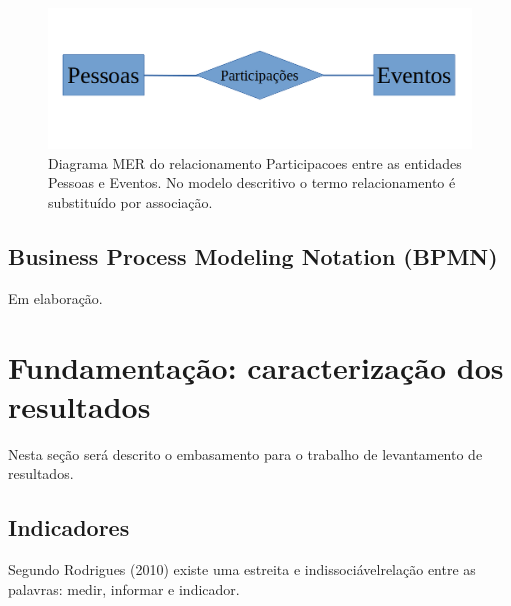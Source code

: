 \documentclass[
12pt,		%
openright,	%
twoside,  %
a4paper,			%
chapter=TITLE,		%
english,			%
french,				%
spanish,			%
brazil				%
]{USPSC-classe/USPSC_RedarTex}
\begin{document}
\captionsetup{format=plain}
\begin{figure}[Htb]

	\begin{center}

		\includegraphics[max size={\textwidth}]{../../imagens/MER-crop.png}

	\end{center}

	\caption{\label{4ad8e04d43602c7274b5a26b3a07d2b00c68d1d7}Diagrama MER do relacionamento Participacoes entre as entidades Pessoas e Eventos. No modelo descritivo o termo relacionamento \'e substitu\'{i}do por associa\c{c}\~ao.}

\end{figure}

\subsection[Business Process Modeling Notation (BPMN)]{Business Process Modeling Notation (BPMN)}\label{Business Process Modeling Notation (BPMN)}
Em elabora\c{c}\~ao.








\section[Fundamenta\c{c}\~ao: caracteriza\c{c}\~ao dos resultados]{Fundamenta\c{c}\~ao: caracteriza\c{c}\~ao dos resultados}\label{Fundamenta\c{c}\~ao: caracteriza\c{c}\~ao dos resultados}
Nesta se\c{c}\~ao ser\'a descrito o embasamento para o trabalho de levantamento de resultados.








\subsection[Indicadores]{Indicadores}\label{Indicadores}
Segundo  Rodrigues (2010)  existe uma \textquotedbl estreita e indissoci\'avel\textquotedbl  rela\c{c}\~ao entre as palavras: medir, informar e indicador.
\end{document}
